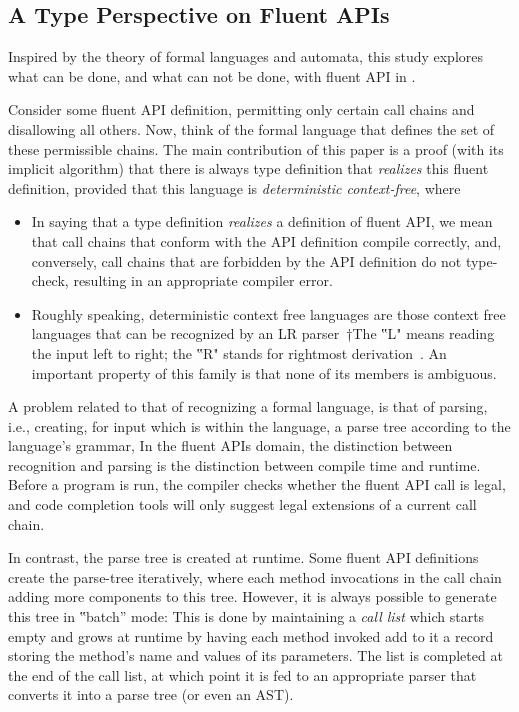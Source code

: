 \subsection{A Type Perspective on Fluent APIs}
Inspired by the theory of formal languages and automata,
this study explores what can be done, and what can not be done, with fluent API in \Java.

Consider some fluent API definition, permitting only certain call
chains and disallowing all others.
Now, think of the formal language that defines the set of these permissible chains.
The main contribution of this paper is a proof (with its implicit algorithm) that
there is always \Java type definition that \emph{realizes} this fluent definition, provided that this
language is \emph{deterministic context-free}, where
\begin{itemize}
  \item In saying that a type definition \emph{realizes} a definition of fluent
    API, we mean that call chains that conform with the API definition compile
    correctly, and, conversely, call chains that are forbidden by the API
    definition do not type-check, resulting in an appropriate compiler error.
  \item Roughly speaking, deterministic context free languages are those
    context free languages that can be recognized by an LR parser~†{The ‟L"
    means reading the input left to right; the ‟R" stands for rightmost derivation}~\cite{Aho:86}.
    An important property of this family is that none of its members is ambiguous.
\end{itemize}

A problem related to that of recognizing a formal language,
is that of parsing, i.e., creating, for input which is within the language,
  a parse tree according to the language's grammar, 
In the fluent APIs domain, the distinction between recognition and parsing is
  the distinction between compile time and runtime.
Before a program is run, the compiler checks whether the fluent API call is legal,
  and code completion tools will only suggest legal extensions of a current call chain.

In contrast, the parse tree is created at runtime.
Some fluent API definitions create the parse-tree
  iteratively, where each method invocations in the call chain adding
  more components to this tree.
However, it is always possible to generate this tree in ‟batch” mode:
This is done by maintaining a \emph{call list} which 
  starts empty and grows at runtime by having each method invoked add to it 
  a record storing the method's name and values of its parameters.  
The list is completed at the end of the call list, at which point it is fed to an appropriate parser that
  converts it into a parse tree (or even an AST).

